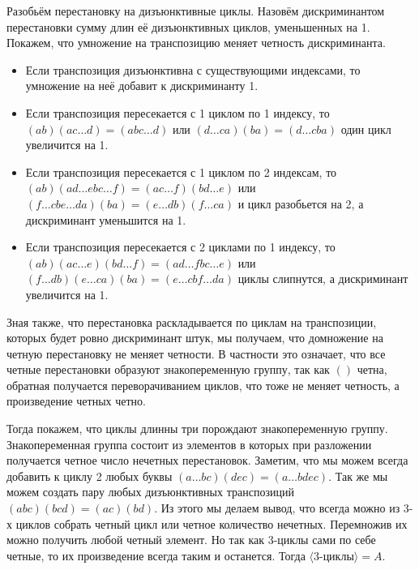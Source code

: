 \documentclass{article}
\begin{document}
\begin{enumerate}
        Разобьём перестановку на дизъюнктивные циклы. Назовём дискриминантом
        перестановки сумму длин её дизъюнктивных циклов, уменьшенных на 1.
        Покажем, что умножение на транспозицию меняет четность дискриминанта.
        \begin{itemize}
            \item Если транспозиция дизъюнктивна с существующими индексами, то
                умножение на неё добавит к дискриминанту 1.
            \item Если транспозиция пересекается с 1 циклом по 1 индексу,
                то $(ab)(ac\ldots d)=(abc\ldots d)$ или $(d\ldots ca)(ba)=
                (d\ldots cba)$ один цикл увеличится на 1.
            \item Если транспозиция пересекается с 1 циклом по 2 индексам,
                то $(ab)(ad\ldots ebc\ldots f)=(ac\ldots f)(bd\ldots e)$ или
                $(f\ldots cbe\ldots da)(ba)=(e\ldots db)(f\ldots ca)$ и цикл
                разобьется на 2, а дискриминант уменьшится на 1.
            \item Если транспозиция пересекается с 2 циклами по 1 индексу, то
                 $(ab)(ac\ldots e)(bd\ldots f)=(ad\ldots fbc\ldots e)$ или
                 $(f\ldots db)(e\ldots ca)(ba)=(e\ldots cbf\ldots da)$ циклы
                 слипнутся, а дискриминант увеличится на 1.
        \end{itemize}
        Зная также, что перестановка раскладывается по циклам на транспозиции,
        которых будет ровно дискриминант штук, мы получаем, что домножение
        на четную перестановку не меняет четности. В частности это означает, что
        все четные перестановки образуют знакопеременную группу, так как $()$
        четна, обратная получается переворачиванием циклов, что тоже не меняет
        четность, а произведение четных четно.

        Тогда покажем, что циклы длинны три порождают знакопеременную группу.
        Знакопеременная группа состоит из элементов в которых при разложении
        получается четное число нечетных перестановок. Заметим, что мы можем 
        всегда добавить к циклу 2 любых буквы $(a\ldots bc)(dec)=(a\ldots bdec)$.
        Так же мы можем создать пару любых дизъюнктивных транспозиций $(abc)(bcd)
        =(ac)(bd)$. Из этого мы делаем вывод, что всегда можно из 3-х циклов
        собрать четный цикл или четное количество нечетных. Перемножив их можно
        получить любой четный элемент. Но так как 3-циклы сами по себе четные,
        то их произведение всегда таким и останется. Тогда $\langle\text{3-циклы}
        \rangle=A$.


\end{enumerate}
\end{document}

